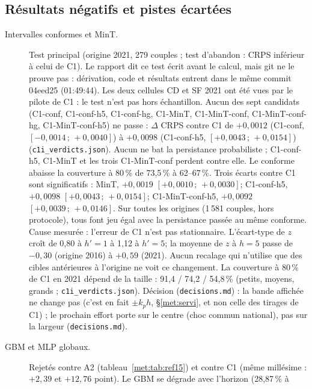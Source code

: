\subsection{Résultats négatifs et pistes écartées}
\label{met:negatifs}
\begin{description}
  \item[Intervalles conformes et MinT.] Test principal (origine 2021, 279 couples ; test d'abandon : CRPS inférieur à
    celui de C1). Le rapport dit ce test écrit avant le calcul, mais git ne le prouve pas : dérivation, code et
    résultats entrent dans le même commit 04eed25 (01:49:44\mesure). Les deux cellules CD et SF 2021 ont
    été vues par le pilote de C1 : le test n'est pas hors échantillon. Aucun des sept candidats (C1-conf,
    C1-conf-h5, C1-conf-hg, C1-MinT, C1-MinT-conf, C1-MinT-conf-hg, C1-MinT-conf-h5) ne passe : $\Delta$
    CRPS contre C1 de $+0{,}0012$ (C1-conf, $[-0{,}0014\,;\,+0{,}0040]$) à $+0{,}0098$ (C1-conf-h5,
    $[+0{,}0043\,;\,+0{,}0154]$)\mesure{} (\texttt{c1i\_verdicts.json}). Aucun ne bat la persistance
    probabiliste ; C1-conf-h5, C1-MinT et les trois C1-MinT-conf perdent contre elle\mesure. Le conforme
    abaisse la couverture à 80\,\% de 73,5\,\% à 62--67\,\%\mesure. Trois écarts contre C1 sont
    significatifs : MinT, $+0{,}0019$ $[+0{,}0010\,;\,+0{,}0030]$\mesure ; C1-conf-h5, $+0{,}0098$
    $[+0{,}0043\,;\,+0{,}0154]$\mesure ; C1-MinT-conf-h5, $+0{,}0092$ $[+0{,}0039\,;\,+0{,}0146]$\mesure. Sur toutes les origines (1\,581 couples,
    hors protocole), tous font jeu égal avec la persistance passée au même conforme\mesure. Cause
    mesurée : l'erreur de C1 n'est pas stationnaire. L'écart-type de $z$ croît de 0,80 à $h' = 1$ à 1,12
    à $h' = 5$\mesure ; la moyenne de $z$ à $h = 5$ passe de $-0{,}30$ (origine 2016) à $+0{,}59$ (2021)\mesure.
    Aucun recalage qui n'utilise que des cibles antérieures à l'origine ne voit ce changement. La
    couverture à 80\,\% de C1 en 2021 dépend de la taille : 91,4 / 74,2 / 54,8\,\%\mesure{} (petits,
    moyens, grands ; \texttt{c1i\_verdicts.json}). Décision (\texttt{decisions.md}) : la bande affichée ne change pas
    (c'est en fait $\pm k_p h$, \S\ref{met:servi}, et non celle des tirages de C1) ; le prochain effort porte sur le centre (choc commun national), pas sur la largeur
    (\texttt{decisions.md}).
  \item[GBM et MLP globaux.] Rejetés contre A2 (tableau~\ref{met:tab:ref15}) et contre C1 (même millésime :
    $+2{,}39$ et $+12{,}76$\derive{} point). Le GBM se dégrade avec l'horizon (28,87\,\%\mesure{} à

\end{description}
